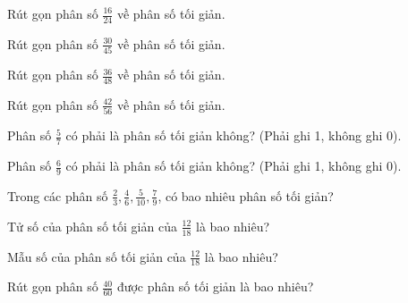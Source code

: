 \begin{ex}
Rút gọn phân số $\frac{16}{24}$ về phân số tối giản.
\end{ex}

\begin{ex}
Rút gọn phân số $\frac{30}{45}$ về phân số tối giản.
\end{ex}

\begin{ex}
Rút gọn phân số $\frac{36}{48}$ về phân số tối giản.
\end{ex}

\begin{ex}
Rút gọn phân số $\frac{42}{56}$ về phân số tối giản.
\end{ex}

\begin{ex}
Phân số $\frac{5}{7}$ có phải là phân số tối giản không? (Phải ghi 1, không ghi 0).
\end{ex}

\begin{ex}
Phân số $\frac{6}{9}$ có phải là phân số tối giản không? (Phải ghi 1, không ghi 0).
\end{ex}

\begin{ex}
Trong các phân số $\frac{2}{3}, \frac{4}{6}, \frac{5}{10}, \frac{7}{9}$, có bao nhiêu phân số tối giản?
\end{ex}

\begin{ex}
Tử số của phân số tối giản của $\frac{12}{18}$ là bao nhiêu?
\end{ex}

\begin{ex}
Mẫu số của phân số tối giản của $\frac{12}{18}$ là bao nhiêu?
\end{ex}

\begin{ex}
Rút gọn phân số $\frac{40}{60}$ được phân số tối giản là bao nhiêu?
\end{ex}

